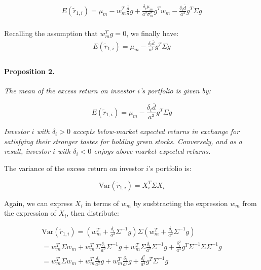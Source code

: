 \begin{equation}
    \begin{aligned}
        E(\tilde{r}_{1,i}) = \mu_m - w_m^T \frac{\bar{d}}{a}g + \frac{\delta_i \mu_m}{a^2\sigma^2_m} g^T w_m - \frac{\delta_i \bar{d}}{a^3} g^T \Sigma g\\
    \end{aligned}
\end{equation}

Recalling the assumption that $w_m^T g = 0$, we finally have:
\begin{equation}
    \begin{aligned}
        E(\tilde{r}_{1,i}) = \mu_m  - \frac{\delta_i \bar{d}}{a^3} g^T \Sigma g\\
    \end{aligned}
\end{equation}


\paragraph{Proposition 2.} \textit{The mean of the excess return on 
investor $i$'s portfolio is given by:}

\begin{equation}
    E(\tilde{r}_{1,i}) = \mu_m - \frac{\delta_i \bar{d}}{a^3} g^T \Sigma g
\end{equation}

\textit{Investor $i$ with $\delta_i > 0$ accepts below-market expected returns 
in exchange for satisfying their stronger tastes for holding green stocks.
Conversely, and as a result, investor $i$ with $\delta_i < 0$ enjoys above-market expected returns.}


The variance of the excess return on investor $i$'s portfolio is:

\begin{equation}
    \text{Var}(\tilde{r}_{1,i}) = X_i^T \Sigma X_i
\end{equation}

Again, we can express $X_i$ in terms of $w_m$ by susbtracting the expression $w_m$
from the expression of $X_i$, then distribute:

\begin{equation}
    \begin{aligned}
        \text{Var}(\tilde{r}_{1,i}) = (w^T_m + \frac{\delta_i}{a^2} \Sigma^{-1}g) \Sigma (w^T_m + \frac{\delta_i}{a^2} \Sigma^{-1}g) \\
        = w^T_m \Sigma w_m + w^T_m \Sigma \frac{\delta_i}{a^2} \Sigma^{-1}g + w^T_m \Sigma \frac{\delta_i}{a^2} \Sigma^{-1}g + \frac{\delta_i^2}{a^4} g^T \Sigma^{-1} \Sigma \Sigma^{-1} g \\
        = w^T_m \Sigma w_m + w^T_m \frac{\delta_i}{a^2} g + w^T_m \frac{\delta_i}{a^2} g + \frac{\delta_i^2}{a^4} g^T \Sigma^{-1} g \\
    \end{aligned}
\end{equation}

